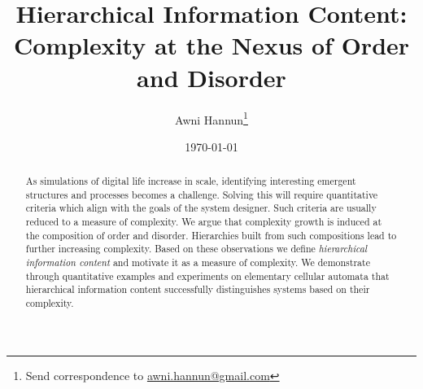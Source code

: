 \documentclass[12pt]{article}
\title{Hierarchical Information Content:\\
    Complexity at the Nexus of Order and Disorder}
\author{Awni Hannun\footnote{
  Send correspondence to
  \href{mailto:awni.hannun@gmail.com}{awni.hannun@gmail.com}}}
\date{\today}
\theoremstyle{definition}
\begin{document}
\maketitle

\begin{abstract}
  As simulations of digital life increase in scale, identifying interesting
  emergent structures and processes becomes a challenge.  Solving this will
  require quantitative criteria which align with the goals of the system
  designer. Such criteria are usually reduced to a measure of complexity. We
  argue that complexity growth is induced at the composition of order and
  disorder. Hierarchies built from such compositions lead to further increasing
  complexity. Based on these observations we define \emph{hierarchical
  information content} and motivate it as a measure of complexity. We
  demonstrate through quantitative examples and experiments on elementary
  cellular automata that hierarchical information content successfully
  distinguishes systems based on their complexity.
\end{abstract}









\end{document}
